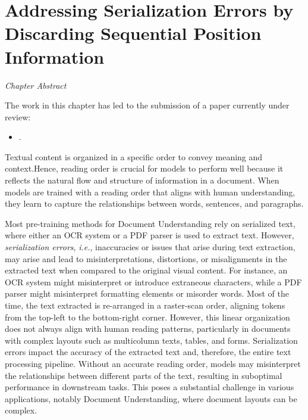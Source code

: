 
\chapter{Addressing Serialization Errors by Discarding Sequential Position Information}
\label{chapter:chapter4}

\renewcommand{\leftmark}{\spacedlowsmallcaps{Addressing Serialization Errors by Discarding Sequential Position Information}}

\begin{chapabstract}
    {\em
    Chapter Abstract


    \vspace*{5mm}
    The work in this chapter has led to the submission of a paper currently under review:}
    \begin{itemize}
        \item \small \fullcite{}.
    \end{itemize}
\end{chapabstract}



\newpage

\minitoc
{}

Textual content is organized in a specific order to convey meaning and context.Hence, reading order is crucial for models to perform well because it reflects the natural flow and structure of information in a document. When models are trained with a reading order that aligns with human understanding, they learn to capture the relationships between words, sentences, and paragraphs. 

Most pre-training methods for Document Understanding rely on serialized text, where either an \ac{OCR} system or a PDF parser is used to extract text. However, \textit{serialization errors}, \textit{i.e.}, inaccuracies or issues that arise during text extraction, may arise and lead to misinterpretations, distortions, or misalignments in the extracted text when compared to the original visual content. For instance, an \ac{OCR} system might misinterpret or introduce extraneous characters, while a PDF parser might misinterpret formatting elements or misorder words. Most of the time, the text extracted is re-arranged in a raster-scan order, aligning tokens from the top-left to the bottom-right corner. However, this linear organization does not always align with human reading patterns, particularly in documents with complex layouts such as multicolumn texts, tables, and forms. Serialization errors impact the accuracy of the extracted text and, therefore, the entire text processing pipeline. Without an accurate reading order, models may misinterpret the relationships between different parts of the text, resulting in suboptimal performance in downstream tasks. This poses a substantial challenge in various applications, notably Document Understanding, where document layouts can be complex. 

